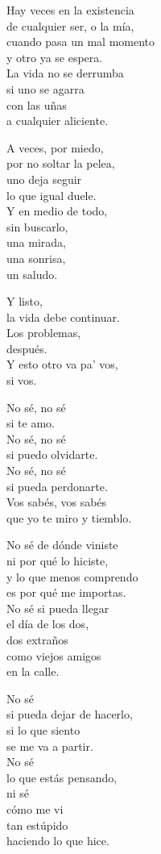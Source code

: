 \begin{lyrics}

Hay veces en la existencia\\
de cualquier ser, o la mía,\\
cuando pasa un mal momento\\
y otro ya se espera.\\
La vida no se derrumba\\
si uno se agarra\\
con las uñas\\
a cualquier aliciente.

A veces, por miedo,\\
por no soltar la pelea,\\
uno deja seguir\\
lo que igual duele.\\
Y en medio de todo,\\
sin buscarlo,\\
una mirada,\\
una sonrisa,\\
un saludo.

Y listo,\\
la vida debe continuar.\\
Los problemas,\\
después.\\
Y esto otro va pa' vos,\\
si vos.

No sé, no sé\\
si te amo.\\
No sé, no sé\\
si puedo olvidarte.\\
No sé, no sé\\
si pueda perdonarte.\\
Vos sabés, vos sabés\\
que yo te miro y tiemblo.

No sé de dónde viniste\\
ni por qué lo hiciste,\\
y lo que menos comprendo\\
es por qué me importas.\\
No sé si pueda llegar\\
el día de los dos,\\
dos extraños\\
como viejos amigos\\
en la calle.

No sé\\
si pueda dejar de hacerlo,\\
si lo que siento\\
se me va a partir.\\
No sé\\
lo que estás pensando,\\
ni sé\\
cómo me vi\\
tan estúpido\\
haciendo lo que hice.


\end{lyrics}
